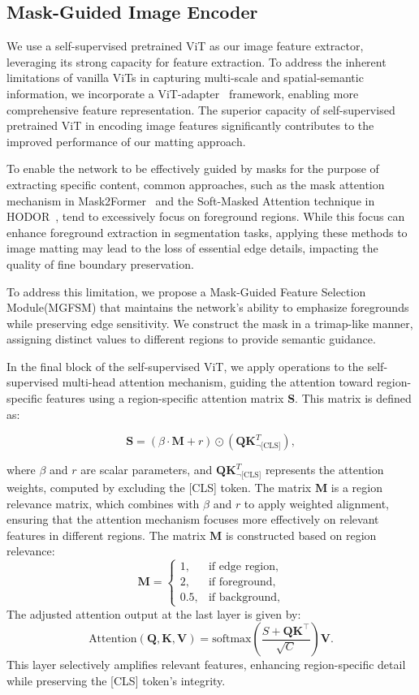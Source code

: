\subsection{Mask-Guided Image Encoder}
\label{sec:encoder}
We use a self-supervised pretrained ViT as our image feature extractor, leveraging its strong capacity for feature extraction. To address the inherent limitations of vanilla ViTs in capturing multi-scale and spatial-semantic information, we incorporate a ViT-adapter~\cite{chen2022vitadapter} framework, enabling more comprehensive feature representation. The superior capacity of self-supervised pretrained ViT in encoding image features significantly contributes to the improved performance of our matting approach.

To enable the network to be effectively guided by masks for the purpose of extracting specific content, common approaches, such as the mask attention mechanism in Mask2Former~\cite{cheng2022mask2former} and the Soft-Masked Attention technique in HODOR~\cite{athar2022hodor}, tend to excessively focus on foreground regions. While this focus can enhance foreground extraction in segmentation tasks, applying these methods to image matting may lead to the loss of essential edge details, impacting the quality of fine boundary preservation.

To address this limitation, we propose a Mask-Guided Feature Selection Module(MGFSM) that maintains the network's ability to emphasize foregrounds while preserving edge sensitivity. We construct the mask in a trimap-like manner, assigning distinct values to different regions to provide semantic guidance. 

In the final block of the self-supervised ViT, we apply operations to the self-supervised multi-head attention mechanism, guiding the attention toward region-specific features using a region-specific attention matrix \( \mathbf{S} \). This matrix is defined as:

\[
\mathbf{S} = (\beta \cdot \mathbf{M} + r) \odot (\mathbf{Q} \mathbf{K}^{T}_{\neg \text{[CLS]}}),
\]

where \( \beta \) and \( r \) are scalar parameters, and \( \mathbf{Q} \mathbf{K}^{T}_{\neg \text{[CLS]}} \) represents the attention weights, computed by excluding the [CLS] token. The matrix \( \mathbf{M} \) is a region relevance matrix, which combines with \( \beta \) and \( r \) to apply weighted alignment, ensuring that the attention mechanism focuses more effectively on relevant features in different regions. The matrix \( \mathbf{M} \) is constructed based on region relevance:
\[
\mathbf{M} =
\begin{cases}
    1, & \text{if edge region,} \\
    2, & \text{if foreground,} \\
    0.5, & \text{if background,}
\end{cases}
\]
The adjusted attention output at the last layer is given by:
\[
\text{Attention}(\mathbf{Q}, \mathbf{K}, \mathbf{V}) = \text{softmax}\left(\frac{S +\mathbf{Q}\mathbf{K}^\top}{\sqrt{C}}\right)\mathbf{V}.
\]
 This layer selectively amplifies relevant features, enhancing region-specific detail while preserving the [CLS] token’s integrity.

